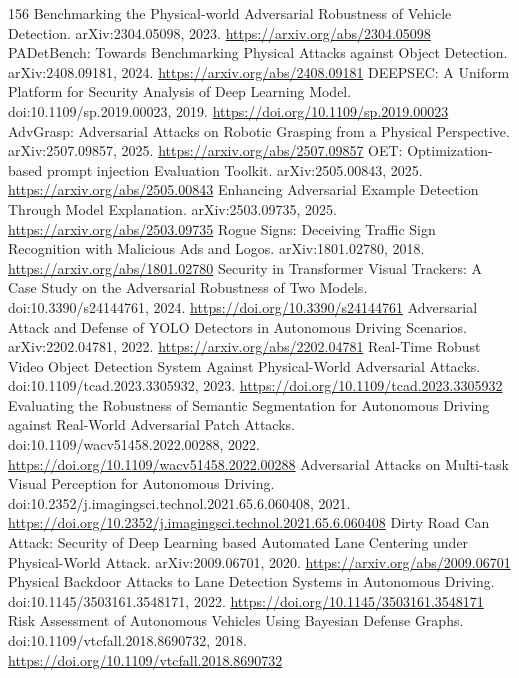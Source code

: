 \documentclass[11pt]{article}
\begin{document}
\begin{thebibliography}{156}
 Benchmarking the Physical-world Adversarial Robustness of Vehicle Detection. arXiv:2304.05098, 2023. \url{https://arxiv.org/abs/2304.05098}
 PADetBench: Towards Benchmarking Physical Attacks against Object Detection. arXiv:2408.09181, 2024. \url{https://arxiv.org/abs/2408.09181}
 DEEPSEC: A Uniform Platform for Security Analysis of Deep Learning Model. doi:10.1109/sp.2019.00023, 2019. \url{https://doi.org/10.1109/sp.2019.00023}
 AdvGrasp: Adversarial Attacks on Robotic Grasping from a Physical Perspective. arXiv:2507.09857, 2025. \url{https://arxiv.org/abs/2507.09857}
 OET: Optimization-based prompt injection Evaluation Toolkit. arXiv:2505.00843, 2025. \url{https://arxiv.org/abs/2505.00843}
 Enhancing Adversarial Example Detection Through Model Explanation. arXiv:2503.09735, 2025. \url{https://arxiv.org/abs/2503.09735}
 Rogue Signs: Deceiving Traffic Sign Recognition with Malicious Ads and Logos. arXiv:1801.02780, 2018. \url{https://arxiv.org/abs/1801.02780}
 Security in Transformer Visual Trackers: A Case Study on the Adversarial Robustness of Two Models. doi:10.3390/s24144761, 2024. \url{https://doi.org/10.3390/s24144761}
 Adversarial Attack and Defense of YOLO Detectors in Autonomous Driving Scenarios. arXiv:2202.04781, 2022. \url{https://arxiv.org/abs/2202.04781}
 Real-Time Robust Video Object Detection System Against Physical-World Adversarial Attacks. doi:10.1109/tcad.2023.3305932, 2023. \url{https://doi.org/10.1109/tcad.2023.3305932}
 Evaluating the Robustness of Semantic Segmentation for Autonomous Driving against Real-World Adversarial Patch Attacks. doi:10.1109/wacv51458.2022.00288, 2022. \url{https://doi.org/10.1109/wacv51458.2022.00288}
 Adversarial Attacks on Multi-task Visual Perception for Autonomous Driving. doi:10.2352/j.imagingsci.technol.2021.65.6.060408, 2021. \url{https://doi.org/10.2352/j.imagingsci.technol.2021.65.6.060408}
 Dirty Road Can Attack: Security of Deep Learning based Automated Lane Centering under Physical-World Attack. arXiv:2009.06701, 2020. \url{https://arxiv.org/abs/2009.06701}
 Physical Backdoor Attacks to Lane Detection Systems in Autonomous Driving. doi:10.1145/3503161.3548171, 2022. \url{https://doi.org/10.1145/3503161.3548171}
 Risk Assessment of Autonomous Vehicles Using Bayesian Defense Graphs. doi:10.1109/vtcfall.2018.8690732, 2018. \url{https://doi.org/10.1109/vtcfall.2018.8690732}

\end{thebibliography}
\end{document}
